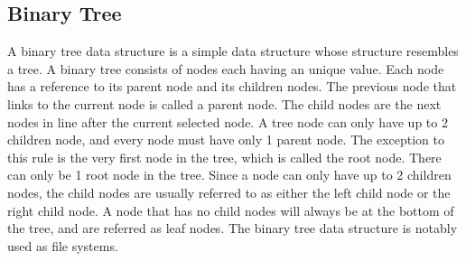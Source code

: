 \subsection{Binary Tree}
A binary tree data structure is a simple data structure whose structure resembles a tree. A binary tree consists of nodes each having an unique value. Each node has a reference to its parent node and its children nodes. The previous node that links to the current node is called a parent node. The child nodes are the next nodes in line after the current selected node. A tree node can only have up to 2 children node, and every node must have only 1 parent node. The exception to this rule is the very first node in the tree, which is called the root node. There can only be 1 root node in the tree. Since a node can only have up to 2 children nodes, the child nodes are usually referred to as either the left child node or the right child node. A node that has no child nodes will always be at the bottom of the tree, and are referred as leaf nodes. The binary tree data structure is notably used as file systems. 